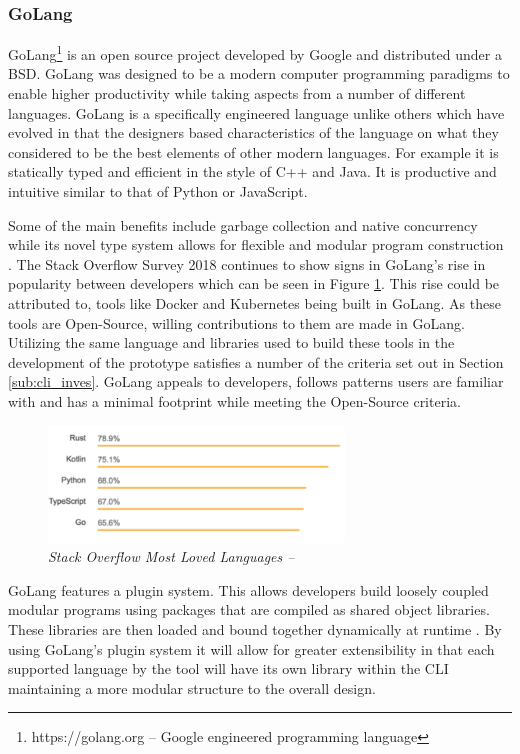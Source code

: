 \subsubsection{GoLang}
\label{sub:golang}
\gls{GoLang}\footnote{https://golang.org -- Google engineered programming language} is an open source project developed by Google and distributed under a \gls{BSD}. \gls{GoLang} was designed to be a modern computer programming paradigms to enable higher productivity while taking aspects from a number of different languages. \gls{GoLang} is a specifically engineered language unlike others which have evolved in that the designers based characteristics of the language on what they considered to be the best elements of other modern languages. For example it is statically typed and efficient in the style of C++ and Java. It is productive and intuitive similar to that of Python or JavaScript. 

Some of the main benefits include garbage collection and native concurrency while its novel type system allows for flexible and modular program construction \citep{golang}. The Stack Overflow Survey 2018 \citep{overflow_2018} continues to show signs in \gls{GoLang}'s rise in popularity between developers which can be seen in Figure \ref{img:surv_2018}. This rise could be attributed to, tools like \gls{Docker} and \gls{Kubernetes} being built in \gls{GoLang}. As these tools are \gls{Open-Source}, willing contributions to them are made in \gls{GoLang}. Utilizing the same language and libraries used to build these tools in the development of the prototype satisfies a number of the criteria set out in Section \ref{sub:cli_inves}. \gls{GoLang} appeals to developers, follows patterns users are familiar with and has a minimal footprint while meeting the \gls{Open-Source} criteria.

\begin{figure}[!ht]
\centering
\includegraphics*[width=0.7\textwidth]{images/a2.png}
\caption{\em Stack Overflow Most Loved Languages -- \cite{overflow_2018}}
\label{img:surv_2018}
\end{figure}

\gls{GoLang} features a plugin system. This allows developers build loosely coupled modular programs using packages that are compiled as shared object libraries. These libraries are then loaded and bound together dynamically at runtime \citep{vivien_2017}. By using \gls{GoLang}'s plugin system it will allow for greater extensibility in that each supported language by the tool will have its own library within the \gls{CLI} maintaining a more modular structure to the overall design.

